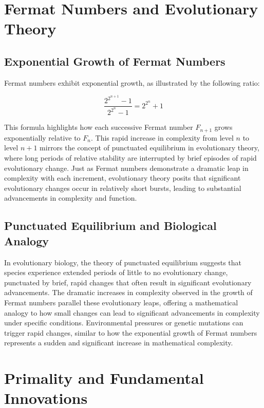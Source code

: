 \documentclass[12pt]{article}
\begin{document}
\section{Fermat Numbers and Evolutionary Theory}

\subsection{Exponential Growth of Fermat Numbers}

Fermat numbers exhibit exponential growth, as illustrated by the following ratio:

\[
\frac{2^{2^{n+1}} - 1}{2^{2^n} - 1} = 2^{2^n} + 1
\]

This formula highlights how each successive Fermat number \( F_{n+1} \) grows exponentially relative to \( F_n \). This rapid increase in complexity from level \( n \) to level \( n+1 \) mirrors the concept of punctuated equilibrium in evolutionary theory, where long periods of relative stability are interrupted by brief episodes of rapid evolutionary change. Just as Fermat numbers demonstrate a dramatic leap in complexity with each increment, evolutionary theory posits that significant evolutionary changes occur in relatively short bursts, leading to substantial advancements in complexity and function.

\subsection{Punctuated Equilibrium and Biological Analogy}

In evolutionary biology, the theory of punctuated equilibrium suggests that species experience extended periods of little to no evolutionary change, punctuated by brief, rapid changes that often result in significant evolutionary advancements. The dramatic increases in complexity observed in the growth of Fermat numbers parallel these evolutionary leaps, offering a mathematical analogy to how small changes can lead to significant advancements in complexity under specific conditions. Environmental pressures or genetic mutations can trigger rapid changes, similar to how the exponential growth of Fermat numbers represents a sudden and significant increase in mathematical complexity.

\section{Primality and Fundamental Innovations}
\end{document}

